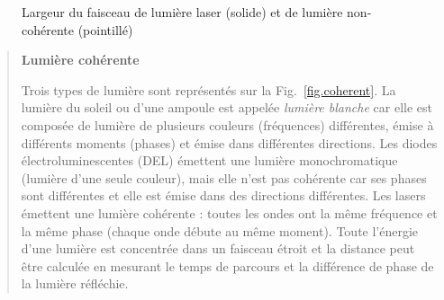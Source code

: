 \begin{figure}
\begin{center}
\end{center}
\caption{Largeur du faisceau de lumière laser (solide) et de lumière non-cohérente (pointillé)}\label{fig.beam}
\end{figure}

\begin{quote}
\begin{center}
\textbf{Lumière cohérente}
\end{center}
Trois types de lumière sont représentés sur la Fig.~\ref{fig.coherent}. La lumière du soleil ou d'une ampoule est appelée \emph{lumière blanche} car elle est composée de lumière de plusieurs couleurs (fréquences) différentes, émise à différents moments (phases) et émise dans différentes directions. Les diodes électroluminescentes (DEL) émettent une lumière monochromatique (lumière d'une seule couleur), mais elle n'est pas cohérente car ses phases sont différentes et elle est émise dans des directions différentes. Les lasers émettent une lumière cohérente : toutes les ondes ont la même fréquence et la même phase (chaque onde débute au même moment). Toute l'énergie d'une lumière est concentrée dans un faisceau étroit et la distance peut être calculée en mesurant le temps de parcours et la différence de phase de la lumière réfléchie.
\end{quote}

